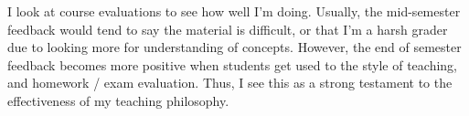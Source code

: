 \documentclass[a4paper,12pt]{article}
\begin{document}

I look at course evaluations to see how well I'm doing. Usually, the mid-semester feedback would tend to say the material is difficult, or that I'm a harsh grader due to looking more for understanding of concepts. However, the end of semester feedback becomes more positive when students get used to the style of teaching, and homework / exam evaluation. Thus, I see this as a strong testament to the effectiveness of my teaching philosophy. 
\end{document}
